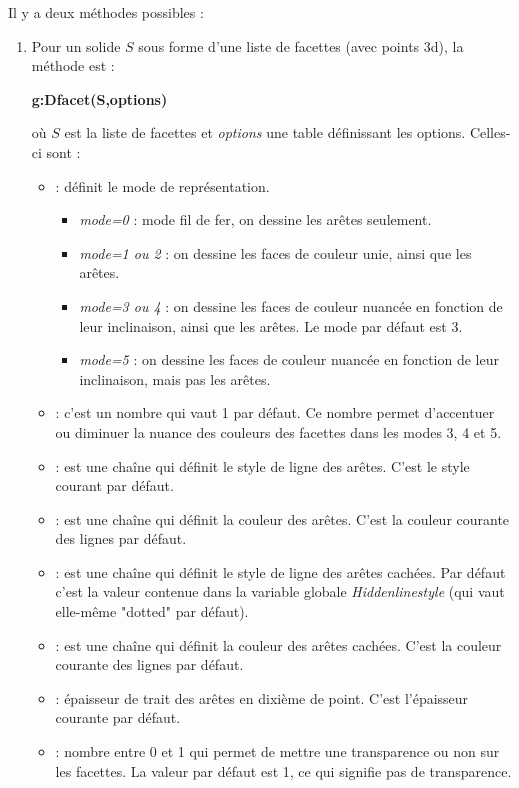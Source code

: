 \documentclass[%
10pt,%
a4paper,%
french,%
]%
{article}%
\begin{document}
Il y a deux méthodes possibles :
\begin{enumerate}
    \item Pour un solide $S$ sous forme d'une liste de facettes (avec points 3d), la méthode est :
    \par\hfil\textbf{g:Dfacet(S,options)}\hfil\par
    où $S$ est la liste de facettes et \emph{options} une table définissant les options. Celles-ci sont :
\begin{itemize}
    \item {} : définit le mode de représentation.
        \begin{itemize}
            \item \emph{mode=0} : mode fil de fer, on dessine les arêtes seulement.
            \item \emph{mode=1 ou 2} : on dessine les faces de couleur unie, ainsi que les arêtes.
            \item \emph{mode=3 ou 4} : on dessine les faces de couleur nuancée en fonction de leur inclinaison, ainsi que les arêtes. Le mode par défaut est 3.
            \item \emph{mode=5} :  on dessine les faces de couleur nuancée en fonction de leur inclinaison, mais pas les arêtes.
        \end{itemize}
        \item {} : c'est un nombre qui vaut 1 par défaut. Ce nombre permet d'accentuer ou diminuer la nuance des couleurs des facettes dans les modes 3, 4 et 5.
        \item {} : est une chaîne qui définit le style de ligne des arêtes. C'est le style courant par défaut.
        \item {} : est une chaîne qui définit la couleur des arêtes. C'est la couleur courante des lignes par défaut.
        \item {} : est une chaîne qui définit le style de ligne des arêtes cachées. Par défaut c'est la valeur contenue dans la variable globale \emph{Hiddenlinestyle} (qui vaut elle-même "dotted" par défaut).
        \item {} : est une chaîne qui définit la couleur des arêtes cachées. C'est la couleur courante des lignes par défaut.
        \item {} : épaisseur de trait des arêtes en dixième de point. C'est l'épaisseur courante par défaut.
        \item {} : nombre entre 0 et 1 qui permet de mettre une transparence ou non sur les facettes. La valeur par défaut est 1, ce qui signifie pas de transparence.

\end{itemize}
\end{enumerate}
\end{document}
